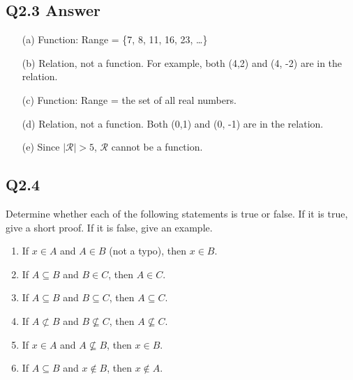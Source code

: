 \documentclass{article}
\begin{document}
\subsection*{Q2.3 Answer}
\begin{enumerate}
    \item[(a)] Function: Range = \{7, 8, 11, 16, 23, \ldots\}
    \item[(b)] Relation, not a function. For example, both (4,2) and (4, -2) are in the relation.
    \item[(c)] Function: Range = the set of all real numbers.
    \item[(d)] Relation, not a function. Both (0,1) and (0, -1) are in the relation.
    \item[(e)] Since \( |\mathcal{R}| > 5 \), \( \mathcal{R} \) cannot be a function.
\end{enumerate}
\newpage

\subsection*{Q2.4}
Determine whether each of the following statements is true or false. If it is true, give a short proof. If it is false, give an example.
\begin{enumerate}[label=\alph*.]
    \item If \( x \in A \) and \( A \in B \) (not a typo), then \( x \in B \).
    \item If \( A \subseteq B \) and \( B \in C \), then \( A \in C \).
    \item If \( A \subseteq B \) and \( B \subseteq C \), then \( A \subseteq C \).
    \item If \( A \not\subset B \) and \( B \not\subseteq C \), then \( A \not\subseteq C \).
    \item If \( x \in A \) and \( A \not\subseteq B \), then \( x \in B \).
    \item If \( A \subseteq B \) and \( x \notin B \), then \( x \notin A \).
\end{enumerate}
\newpage
\end{document}
